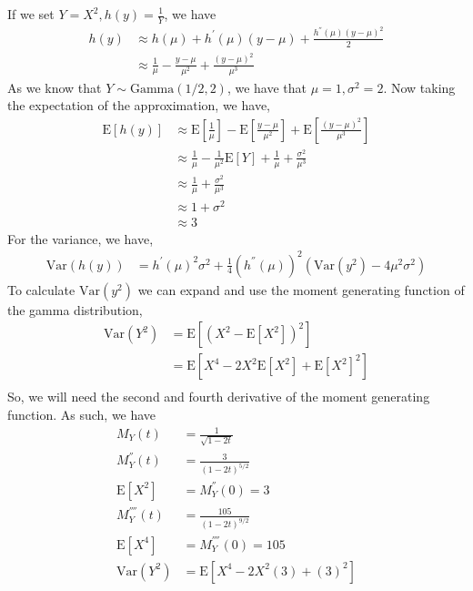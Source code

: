 \documentclass[11pt]{article}
\begin{document}
\begin{enumerate}[(a)]
\begin{enumerate}[(a)]
    If we set $Y = X^2, h(y) = \frac{1}{Y}$, we have
    \begin{align*}
      h(y) &\approx h(\mu) + h^{'}(\mu)(y-\mu) +
      \frac{h^{''}(\mu)(y-\mu)^2}{2} \\
      &\approx \frac{1}{\mu} - \frac{y-\mu}{\mu^2} +
      \frac{(y-\mu)^2}{\mu^3}
    \end{align*}
    As we know that $Y \sim \mathrm{Gamma}(1/2, 2)$, we have that $\mu
    = 1, \sigma^2 = 2$.  Now taking the expectation of the approximation, we have,
    \begin{align*}
      \mathrm{E}[h(y)] &\approx \mathrm{E}\left[ \frac{1}{\mu}
      \right]- \mathrm{E} \left[ \frac{y-\mu}{\mu^2} \right] +
      \mathrm{E} \left[ \frac{(y-\mu)^2}{\mu^3} \right] \\
      &\approx \frac{1}{\mu} - \frac{1}{\mu^2}\mathrm{E}[Y] +
      \frac{1}{\mu} + \frac{\sigma^2}{\mu^3}
      \\
      &\approx \frac{1}{\mu} + \frac{\sigma^2}{\mu^3} \\
      &\approx 1 + \sigma^2 \\
      &\approx 3
    \end{align*}
    For the variance, we have,
    \begin{align*}
      \mathrm{Var}(h(y)) &= h^{'}(\mu)^2 \sigma^2 + \frac{1}{4}(h^{''}(\mu))^2 (\mathrm{Var}(y^2)-4 \mu^2 \sigma^2)
    \end{align*}
    To calculate $\mathrm{Var}(y^2)$ we can expand and use the moment
    generating function of the gamma distribution,
    \begin{align*}
      \mathrm{Var}(Y^2) &= \mathrm{E}\left[(X^2-\mathrm{E}[X^2])^2\right] \\
      &= \mathrm{E} \left[X^4 - 2X^2 \mathrm{E}[X^2] + \mathrm{E}[X^2]^2\right] \\
    \end{align*}
    So, we will need the second and fourth derivative of the moment
    generating function.  As such, we have
    \begin{align*}
      M_Y(t) &= \frac{1}{\sqrt{1-2t}} \\
      M_Y^{''}(t) &= \frac{3}{(1-2t)^{5/2}} \\
      \mathrm{E}[X^2] &= M_Y^{''}(0) = 3 \\
      M_Y^{''''}(t) &= \frac{105}{(1-2t)^{9/2}} \\
      \mathrm{E}[X^4] &= M_Y^{''''}(0) = 105 \\
      \mathrm{Var}(Y^2) &= \mathrm{E}[X^4 - 2X^2(3) + (3)^2] \\

\end{align*}
\end{enumerate}
\end{enumerate}
\end{document}
